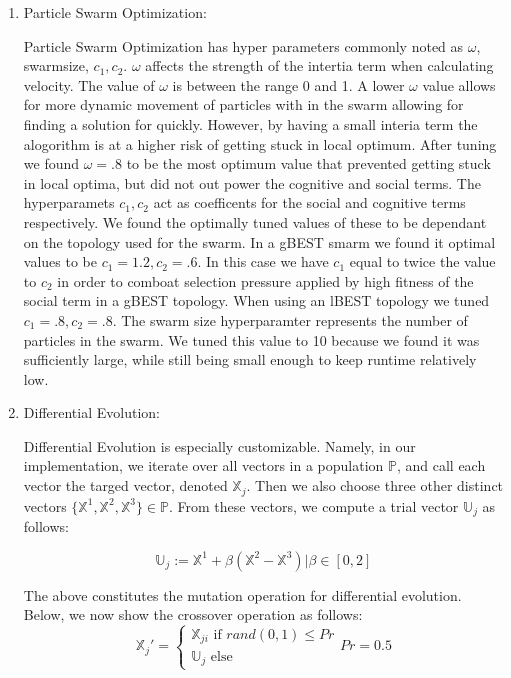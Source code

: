 \documentclass[twoside,11pt]{article}
\begin{document}
\begin{enumerate}
\item Particle Swarm Optimization:

	Particle Swarm Optimization has hyper parameters commonly noted as $\omega$, swarmsize, $c_1, c_2$. $\omega$ affects the strength of the intertia term when calculating velocity. The value of $\omega$ is between the range 0 and 1. A lower $\omega$ value allows for more dynamic movement of particles with in the swarm allowing for finding a solution for quickly. However, by having a small interia term the alogorithm is at a higher risk of getting stuck in local optimum. After tuning we found $\omega = .8$ to be the most optimum value that prevented getting stuck in local optima, but did not out power the cognitive and social terms. The hyperparamets $c_1, c_2$ act as coefficents for the social and cognitive terms respectively. We found the optimally tuned values of these to be dependant on the topology used for the swarm. In a gBEST smarm we found it optimal values to be $c_1 = 1.2, c_2 = .6$. In this case we have $c_1$ equal to twice the value to $c_2$ in order to comboat selection pressure applied by high fitness of the social term in a gBEST topology. When using an lBEST topology we tuned $c_1 = .8, c_2 = .8$. The swarm size hyperparamter represents the number of particles in the swarm. We tuned this value to 10 because we found it was sufficiently large, while still being small enough to keep runtime relatively low.
  
\item Differential Evolution:

	Differential Evolution is especially customizable. Namely, in our implementation, we iterate over all vectors in a population $\mathbb{P}$, and call each vector
		the targed vector, denoted $\mathbb{X}_j$. Then we also choose three other distinct vectors $\{\mathbb{X}^1, \mathbb{X}^2, \mathbb{X}^3\}\in \mathbb{P}$.
		From these vectors, we compute a trial vector $\mathbb{U}_j$ as follows:

		\begin{equation}
			\mathbb{U}_j := \mathbb{X}^1 + \beta(\mathbb{X}^2 - \mathbb{X}^3) | \beta \in [0,2]
		\end{equation}

		The above constitutes the mutation operation for differential evolution. Below, we now show the crossover operation as follows:
		\begin{equation}
		\mathbb{X}_j'=
		\begin{cases}
			\mathbb{X}_{ji} \text{ if } rand(0,1)\leq Pr \\
			\mathbb{U}_j \text{ else}
		\end{cases}
		Pr = 0.5
		\end{equation}


\end{enumerate}
\end{document}
